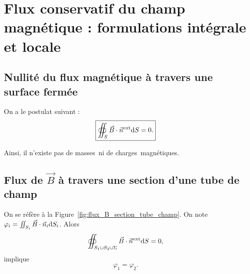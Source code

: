 \section[Flux du champ magnétique]{Flux conservatif du champ magnétique : formulations intégrale et locale}
    \subsection{Nullité du flux magnétique à travers une surface fermée}

        On a le postulat suivant :
        \begin{equation}
            \boxed{
                \oiint_{S}\vec{B}\cdot\vec{n}^{\text{ext}}\mathrm{d} S=0.
            }
        \end{equation}

        Ainsi, il n'existe pas de \og masses\fg~ni de \og charges\fg~magnétiques.

    \subsection{Flux de \texorpdfstring{$\vec{B}$}{B} à travers une section d'une tube de champ}

        On se réfère à la Figure~\ref{fig:flux_B_section_tube_champ}. On note $\varphi_{i}=\iint_{S_i}\vec{B}\cdot\vec{n}_i\mathrm{d} S_i$. Alors
        \begin{equation}
            \oiint_{S_1\cup S_2\cup\Sigma}\vec{B}\cdot\vec{n}^{\text{ext}}\mathrm{d} S=0,
        \end{equation}
        implique
        \begin{equation}
            \boxed{
                \varphi_1=\varphi_2.
            }
        \end{equation}

